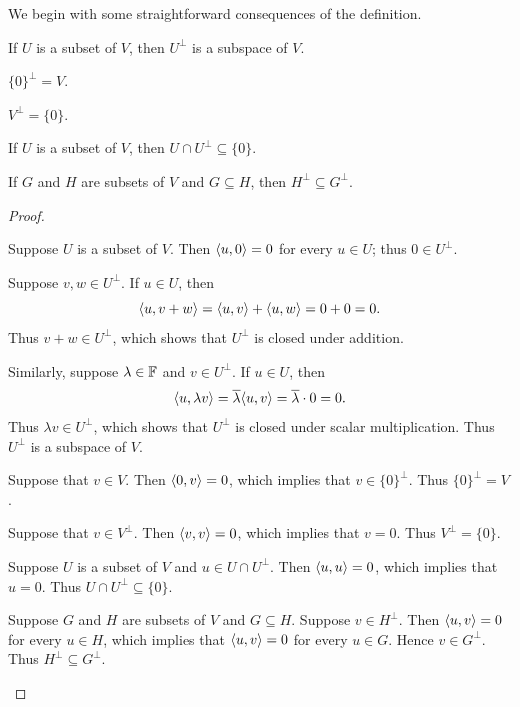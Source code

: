 We begin with some straightforward consequences of the definition.

\begin{result}\label{ax:6.48}\leavevmode
\begin{parts}
\item If $U$ is a subset of $V$, then $U^\perp$ is a subspace of $V$.
\item $\{0\}^\perp=V$.
\item $V^\perp=\{0\}$.
\item If $U$ is a subset of $V$, then $U\cap U^\perp\subseteq\{0\}$.
\item If $G$ and $H$ are subsets of $V$ and $G\subseteq H$, then
  $H^\perp\subseteq G^\perp$.
\end{parts}
\end{result}

\begin{proof}\leavevmode
\begin{parts}
\item Suppose $U$ is a subset of $V$. Then $\langle u, 0 \rangle=0$ for every $u\in U$;
  thus $0\in U^\perp$.

  Suppose $v,w\in U^\perp$. If $u\in U$, then
  \[ \langle u, v+w \rangle = \langle u, v \rangle+\langle u, w \rangle = 0+0 = 0. \]
  Thus $v+w\in U^\perp$, which shows that $U^\perp$ is closed under addition.

  Similarly, suppose $\lambda\in\mathbb{F}$ and $v\in U^\perp$. If $u\in U$, then
  \[ \langle u, \lambda v \rangle = \overline{\lambda}\langle u, v \rangle
     = \overline{\lambda}\cdot0 = 0. \]
  Thus $\lambda v\in U^\perp$, which shows that $U^\perp$ is closed under
  scalar multiplication. Thus $U^\perp$ is a subspace of $V$.
\item Suppose that $v\in V$. Then $\langle 0, v \rangle=0$, which implies that
  $v\in\{0\}^\perp$. Thus $\{0\}^\perp=V$.
\item Suppose that $v\in V^\perp$. Then $\langle v, v \rangle=0$, which implies that
  $v=0$. Thus $V^\perp=\{0\}$.
\item Suppose $U$ is a subset of $V$ and $u\in U\cap U^\perp$. Then
  $\langle u, u \rangle=0$, which implies that $u=0$. Thus $U\cap U^\perp\subseteq\{0\}$.
\item Suppose $G$ and $H$ are subsets of $V$ and $G\subseteq H$. Suppose
  $v\in H^\perp$. Then $\langle u, v \rangle=0$ for every $u\in H$, which implies that
  $\langle u, v \rangle=0$ for every $u\in G$. Hence $v\in G^\perp$. Thus
  $H^\perp\subseteq G^\perp$. \qedhere
\end{parts}
\end{proof}

